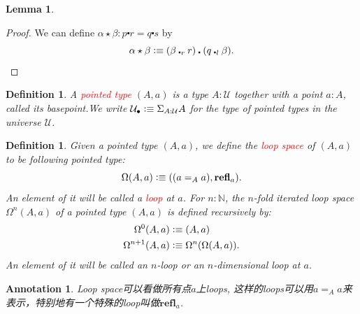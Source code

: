 \documentclass{article}
\newtheorem{lemma}[theorem]{Lemma}
\newtheorem{definition}[theorem]{Definition}
\newtheorem{annotation}[theorem]{Annotation}
\newcommand{\redt}[1]{\textcolor{red}{#1}}
\newcommand{\defeqv}{\vcentcolon\equiv}
\newcommand{\refl}{\textbf{refl}}
\begin{document}
\begin{lemma}
\begin{center}
\end{center}
\end{lemma}

\begin{proof}
\rm We can define $\alpha \star \beta : p \centerdot r = q \centerdot s$ by
\[
    \alpha \star \beta \defeqv (\beta \centerdot_r r) \centerdot (q \centerdot_l \beta).
\]
\end{proof}


\begin{definition}
\rm A \redt{pointed type} $(A, a)$ is a type $A : \mathcal{U}$ together with a point $a : A$, called its basepoint.We write $\mathcal{U}_{\bullet}\defeqv \Sigma_{A : \mathcal{U}} A$ for the type of pointed types in the universe $\mathcal{U}$.
\end{definition}

\begin{definition}
\rm Given a pointed type $(A, a)$, we define the \redt{loop space} of $(A, a)$ to be following pointed type:
\[
    \Omega(A, a) \defeqv ((a =_A a), \refl_a).
\]
An element of it will be called a \redt{loop} at $a$. For $n : \mathbb{N}$, the $n$-fold iterated loop space $\Omega^{n}(A, a)$ of a pointed type $(A, a)$ is defined recursively by:
\[
    \begin{aligned}
        \Omega^0(A, a) &\defeqv (A, a) \\
        \Omega^{n+1}(A, a) &\defeqv \Omega^n(\Omega(A,a)).
    \end{aligned}
\]
An element of it will be called an $n$-loop or an $n$-dimensional loop at $a$.
\end{definition}

\begin{annotation}
\rm Loop space可以看做所有点$a$上loops, 这样的loops可以用$a =_A a$来表示，特别地有一个特殊的loop叫做$\refl_a$. 
\end{annotation}
\end{document}
